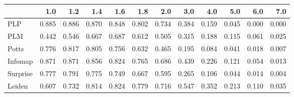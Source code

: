 \begin{tabular}{lrrrrrrrrrrr}
\toprule
{} &   1.0 &   1.2 &   1.4 &   1.6 &   1.8 &   2.0 &   3.0 &   4.0 &   5.0 &   6.0 &   7.0 \\
\midrule
PLP      & 0.885 & 0.886 & 0.870 & 0.848 & 0.802 & 0.734 & 0.384 & 0.159 & 0.045 & 0.000 & 0.000 \\
PLM      & 0.442 & 0.546 & 0.667 & 0.687 & 0.612 & 0.505 & 0.315 & 0.188 & 0.115 & 0.061 & 0.025 \\
Potts    & 0.776 & 0.817 & 0.805 & 0.756 & 0.632 & 0.465 & 0.195 & 0.084 & 0.041 & 0.018 & 0.007 \\
Infomap  & 0.871 & 0.871 & 0.856 & 0.824 & 0.765 & 0.686 & 0.439 & 0.226 & 0.121 & 0.054 & 0.013 \\
Surprise & 0.777 & 0.791 & 0.775 & 0.749 & 0.667 & 0.595 & 0.265 & 0.106 & 0.044 & 0.014 & 0.004 \\
Leiden   & 0.607 & 0.732 & 0.814 & 0.824 & 0.779 & 0.716 & 0.547 & 0.352 & 0.213 & 0.110 & 0.035 \\
\bottomrule
\end{tabular}
